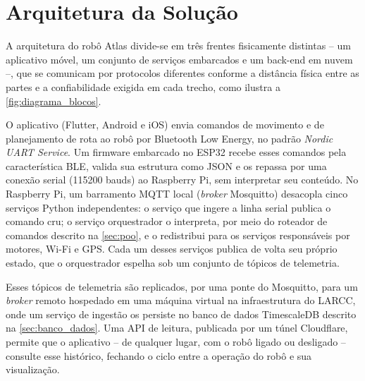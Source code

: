 \section{Arquitetura da Solução} \label{sec:arquitetura}
A arquitetura do robô Atlas divide-se em três frentes fisicamente distintas -- um aplicativo móvel, um conjunto de serviços embarcados e um back-end em nuvem --, que se comunicam por protocolos diferentes conforme a distância física entre as partes e a confiabilidade exigida em cada trecho, como ilustra a \autoref{fig:diagrama_blocos}.

O aplicativo (Flutter, Android e iOS) envia comandos de movimento e de planejamento de rota ao robô por Bluetooth Low Energy, no padrão \textit{Nordic UART Service}. Um firmware embarcado no ESP32 recebe esses comandos pela característica BLE, valida sua estrutura como JSON e os repassa por uma conexão serial (115200 bauds) ao Raspberry Pi, sem interpretar seu conteúdo. No Raspberry Pi, um barramento MQTT local (\textit{broker} Mosquitto) desacopla cinco serviços Python independentes: o serviço que ingere a linha serial publica o comando cru; o serviço orquestrador o interpreta, por meio do roteador de comandos descrito na \autoref{sec:poo}, e o redistribui para os serviços responsáveis por motores, Wi-Fi e GPS. Cada um desses serviços publica de volta seu próprio estado, que o orquestrador espelha sob um conjunto de tópicos de telemetria.

Esses tópicos de telemetria são replicados, por uma ponte do Mosquitto, para um \textit{broker} remoto hospedado em uma máquina virtual na infraestrutura do LARCC, onde um serviço de ingestão os persiste no banco de dados TimescaleDB descrito na \autoref{sec:banco_dados}. Uma API de leitura, publicada por um túnel Cloudflare, permite que o aplicativo -- de qualquer lugar, com o robô ligado ou desligado -- consulte esse histórico, fechando o ciclo entre a operação do robô e sua visualização.


